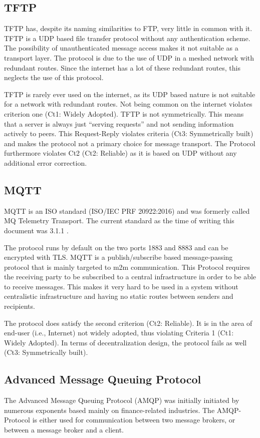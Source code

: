 \documentclass[a4paper,appendixprefix,pdfusetitle,twocolumn,fontsize=8pt,draft,DIV=calc,8pt]{\doctype} %
\begin{document}
\subsection{TFTP}
TFTP has, despite its naming similarities to FTP, very little in common with it. TFTP is a UDP based file transfer protocol without any authentication scheme. The possibility of unauthenticated message access makes it not suitable as a transport layer. The protocol is due to the use of UDP in a meshed network with redundant routes. Since the internet has a lot of these redundant routes, this neglects the use of this protocol.

TFTP is rarely ever used on the internet, as its UDP based nature is not suitable for a network with redundant routes. Not being common on the internet violates criterion one (Ct1: Widely Adopted). TFTP is not symmetrically. This means that a server is always just ``serving requests'' and not sending information actively to peers. This Request-Reply violates criteria (Ct3: Symmetrically built) and makes the protocol not a primary choice for message transport. The Protocol furthermore violates Ct2 (Ct2: Reliable) as it is based on UDP without any additional error correction.

\subsection{MQTT}
MQTT is an ISO standard (ISO/IEC PRF 20922:2016) and was formerly called MQ Telemetry Transport. The current standard as the time of writing this document was 3.1.1 \cite{mqtt}. 

The protocol runs by default on the two ports 1883 and 8883 and can be encrypted with TLS. MQTT is a publish/subscribe based message-passing protocol that is mainly targeted to m2m communication. This Protocol requires the receiving party to be subscribed to a central infrastructure in order to be able to receive messages. This makes it very hard to be used in a system without centralistic infrastructure and having no static routes between senders and recipients.

The protocol does satisfy the second criterion (Ct2: Reliable). It is in the area of end-user (i.e., Internet) not widely adopted, thus violating Criteria 1 (Ct1: Widely Adopted). In terms of decentralization design, the protocol fails as well (Ct3: Symmetrically built).

\subsection{Advanced Message Queuing Protocol}
The Advanced Message Queuing Protocol (AMQP) was initially initiated by numerous exponents based mainly on finance-related industries. The AMQP-Protocol is either used for communication between two message brokers, or between a message broker and a client\cite{amqp}.
\end{document}
